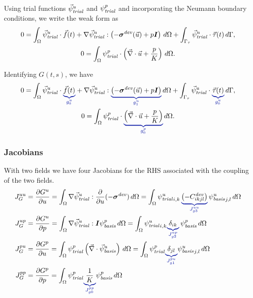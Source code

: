 Using trial functions $\trialvec[u]$ and $\trialscalar[p]$ and
incorporating the Neumann boundary conditions, we write the weak form
as
\begin{gather}
  0 = 
  \int_\Omega \trialvec[u] \cdot \vec{f}(t) + \nabla \trialvec[u] : \left(-\tensor{\sigma}^\mathit{dev}(\vec{u}) + p\tensor{I}
  \right)\, d\Omega + \int_{\Gamma_\tau} \trialvec[u] \cdot \vec{\tau}(t) \, d\Gamma, \\
  0 = \int_\Omega \trialscalar[p] \cdot \left(\vec{\nabla} \cdot \vec{u} + \frac{p}{K} \right) 
\, d\Omega.
\end{gather}

Identifying $G(t,s)$, we have
\begin{gather}
  \label{eqn:incompressible:elasticity:displacement}
  0 = \int_\Omega \trialvec[u] \cdot \eqnannotate{\vec{f}(t)}{g_0^u} + \nabla \trialvec[u] :
  \eqnannotate{\left(-\tensor{\sigma}^\mathit{dev}(\vec{u}) + p\tensor{I}\right)}{g_1^u}  \, d\Omega
  + \int_{\Gamma_\tau} \trialvec[u] \cdot \eqnannotate{\vec{\tau}(t)}{g_0^u} \, d\Gamma, \\
%
  \label{eqn:incompressible:elasticity:pressure}
  0 = \int_\Omega \trialscalar[p] \cdot \eqnannotate{\left(\vec{\nabla} \cdot \vec{u} + 
\frac{p}{K} \right)}{g_0^p} \, d\Omega.
\end{gather}


\subsubsection{Jacobians}

With two fields we have four Jacobians for the RHS associated with the coupling of 
the two fields.
\begin{align}
  J_G^{uu} &= \frac{\partial G^u}{\partial u} = \int_\Omega \nabla \trialvec[u] : 
\frac{\partial}{\partial u}(-
\tensor{\sigma}^\mathit{dev}) \, d\Omega 
  = \int_\Omega \trialscalar[u]_{i,k} \, \eqnannotate{\left(-C^\mathit{dev}_{ikjl}\right)}
{J_{g3}^{uu}}  \, 
\basisscalar[u]_{j,l}\, d\Omega \\
  J_G^{up} &= \frac{\partial G^u}{\partial p} = \int_\Omega \nabla\trialvec[u] : \tensor{I} 
\basisscalar[p] \,  d\Omega = \int_\Omega \trialscalar[u]_{i,k} \eqnannotate{\delta_{ik}}{J_{g2}^{up}} \, 
\basisscalar[p] \, d\Omega \\
%
  J_G^{pu} &= \frac{\partial G^p}{\partial u} = \int_\Omega \trialscalar[p] \left(\vec{\nabla} 
\cdot \basisvec[u]\right) \, d\Omega = \int_\Omega \trialscalar[p] \eqnannotate{\delta_{jl}}{J_{g1}^{pu}} 
\basisscalar[u]_{j,l} \, d\Omega\\
  J_G^{pp} &= \frac{\partial G^p}{\partial p} = \int_\Omega \trialscalar[p] \eqnannotate{\frac{1}
{K}}{J_{g0}^{pp}} \basisscalar[p] \, d\Omega
\end{align}


